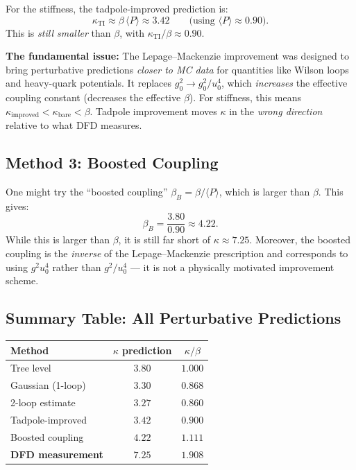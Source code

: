 \documentclass[11pt]{article}
\begin{document}
For the stiffness, the tadpole-improved prediction is:
\begin{equation}\label{eq:kappa_TI}
  \kappa_{\text{TI}} \approx \beta\,\langle P\rangle \approx 3.42
  \qquad\text{(using $\langle P\rangle \approx 0.90$)}.
\end{equation}
This is \emph{still smaller} than $\beta$, with $\kappa_{\text{TI}}/\beta \approx 0.90$.

\medskip
\noindent\textbf{The fundamental issue:} The Lepage--Mackenzie improvement
was designed to bring perturbative predictions \emph{closer to MC data}
for quantities like Wilson loops and heavy-quark potentials.  It replaces
$g_0^2 \to g_0^2/u_0^4$, which \emph{increases} the effective coupling
constant (decreases the effective $\beta$).  For stiffness, this means
$\kappa_{\text{improved}} < \kappa_{\text{bare}} < \beta$.  Tadpole
improvement moves $\kappa$ in the \emph{wrong direction} relative to
what DFD measures.

\subsection{Method 3: Boosted Coupling}

One might try the ``boosted coupling'' $\beta_B = \beta/\langle P\rangle$,
which is larger than $\beta$.  This gives:
\begin{equation}
  \beta_B = \frac{3.80}{0.90} \approx 4.22.
\end{equation}
While this is larger than $\beta$, it is still far short of
$\kappa \approx 7.25$.  Moreover, the boosted coupling is the
\emph{inverse} of the Lepage--Mackenzie prescription and corresponds
to using $g^2 u_0^4$ rather than $g^2/u_0^4$ --- it is not a
physically motivated improvement scheme.

\subsection{Summary Table: All Perturbative Predictions}

\begin{center}
\begin{tabular}{lcc}
\toprule
Method & $\kappa$ prediction & $\kappa/\beta$ \\
\midrule
Tree level & $3.80$ & $1.000$ \\
Gaussian (1-loop) & $3.30$ & $0.868$ \\
2-loop estimate & $3.27$ & $0.860$ \\
Tadpole-improved & $3.42$ & $0.900$ \\
Boosted coupling & $4.22$ & $1.111$ \\
\midrule
\textbf{DFD measurement} & $\mathbf{7.25}$ & $\mathbf{1.908}$ \\
\bottomrule
\end{tabular}
\end{center}
\end{document}

